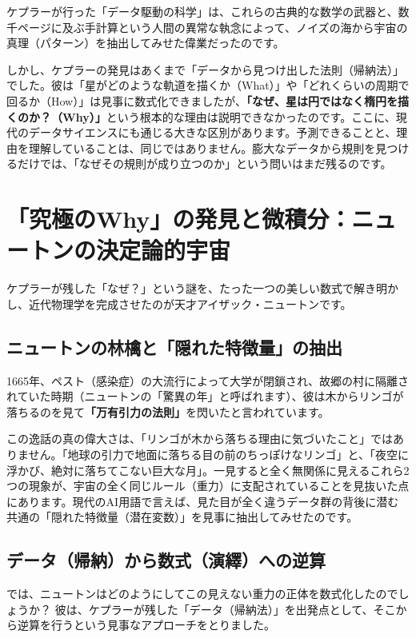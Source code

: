 ケプラーが行った「データ駆動の科学」は、これらの古典的な数学の武器と、数千ページに及ぶ手計算という人間の異常な執念によって、ノイズの海から宇宙の真理（パターン）を抽出してみせた偉業だったのです。

しかし、ケプラーの発見はあくまで「データから見つけ出した法則（帰納法）」でした。彼は「星がどのような軌道を描くか（What）」や「どれくらいの周期で回るか（How）」は見事に数式化できましたが、\textbf{「なぜ、星は円ではなく楕円を描くのか？（Why）」}という根本的な理由は説明できなかったのです。ここに、現代のデータサイエンスにも通じる大きな区別があります。予測できることと、理由を理解していることは、同じではありません。膨大なデータから規則を見つけるだけでは、「なぜその規則が成り立つのか」という問いはまだ残るのです。

\section{「究極のWhy」の発見と微積分：ニュートンの決定論的宇宙}

ケプラーが残した「なぜ？」という謎を、たった一つの美しい数式で解き明かし、近代物理学を完成させたのが天才アイザック・ニュートンです。

\subsection{ニュートンの林檎と「隠れた特徴量」の抽出}

1665年、ペスト（感染症）の大流行によって大学が閉鎖され、故郷の村に隔離されていた時期（ニュートンの「驚異の年」と呼ばれます）、彼は木からリンゴが落ちるのを見て\textbf{「万有引力の法則」}を閃いたと言われています。

この逸話の真の偉大さは、「リンゴが木から落ちる理由に気づいたこと」ではありません。「地球の引力で地面に落ちる目の前のちっぽけなリンゴ」と、「夜空に浮かび、絶対に落ちてこない巨大な月」。一見すると全く無関係に見えるこれら2つの現象が、宇宙の全く同じルール（重力）に支配されていることを見抜いた点にあります。現代のAI用語で言えば、見た目が全く違うデータ群の背後に潜む共通の「隠れた特徴量（潜在変数）」を見事に抽出してみせたのです。

\subsection{データ（帰納）から数式（演繹）への逆算}

では、ニュートンはどのようにしてこの見えない重力の正体を数式化したのでしょうか？ 彼は、ケプラーが残した「データ（帰納法）」を出発点として、そこから逆算を行うという見事なアプローチをとりました。

